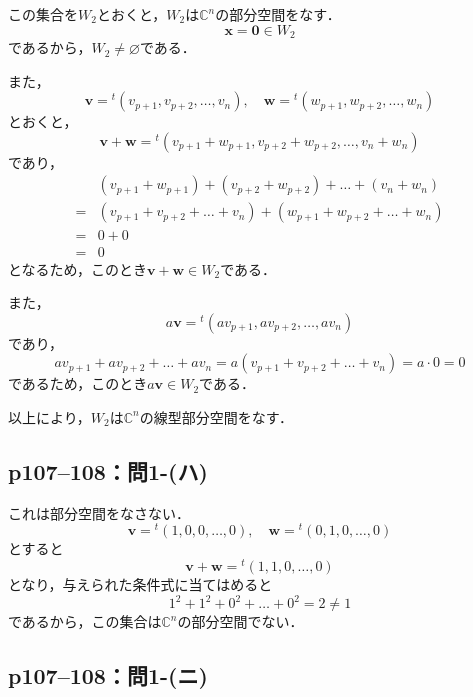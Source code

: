 \documentclass[a4paper,10pt,fleqn]{ltjsarticle}
\begin{document}
\begin{tleftbar}
    この集合を$W_2$とおくと，$W_2$は$\mathbb{C}^n$の部分空間をなす．
    \[
        \bm{x} = \bm{0} \in W_2
    \]
    であるから，$W_2 \ne \varnothing$である．

    また，
    \[
        \bm{v} ={}^t (v_{p+1} , v_{p+2} , \ldots , v_{n} ) , \quad \bm{w} ={}^t ( w_{p+1} , w_{p+2} , \ldots , w_{n} )
    \]
    とおくと，
    \[
        \bm{v}+ \bm{w} = {}^t (v_{p+1}+w_{p+1},v_{p+2}+w_{p+2},\ldots,v_n + w_n)
    \]
    であり，
    \begin{align*}
          & ( v_{p+1}+w_{p+1}) +(v_{p+2}+w_{p+2})+ \dots + (v_n+w_n) \\
        = & (v_{p+1}+v_{p+2}+\dots+v_n)+(w_{p+1}+w_{p+2}+\dots+w_n)  \\
        = & 0+0                                                      \\
        = & 0
    \end{align*}
    となるため，このとき$\bm{v}+\bm{w} \in W_2$である．

    また，
    \[
        a\bm{v} = {}^t (av_{p+1},av_{p+2},\ldots,av_n)
    \]
    であり，
    \[
        av_{p+1} + av_{p+2}+\dots + av_n =a (v_{p+1}+v_{p+2}+\dots+v_n) = a\cdot 0 =0
    \]
    であるため，このとき$a \bm{v} \in W_2$である．

    以上により，$W_2$は$\mathbb{C}^n$の線型部分空間をなす．
\end{tleftbar}

\subsection*{p107--108：問1-(ハ)}

\begin{tleftbar}
    これは部分空間をなさない．
    \[
        \bm{v}= {}^t (1,0,0,\ldots , 0),\quad \bm{w}={}^t (0,1,0,\ldots ,0)
    \]
    とすると
    \[
        \bm{v} + \bm{w}={}^t (1,1,0,\ldots,0)
    \]
    となり，与えられた条件式に当てはめると
    \[
        1^2+1^2+0^2 +\dots + 0^2 =2 \ne 1
    \]
    であるから，この集合は$\mathbb{C}^n$の部分空間でない．
\end{tleftbar}


\subsection*{p107--108：問1-(ニ)}
\end{document}
